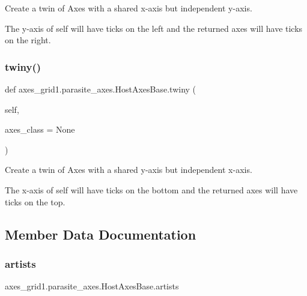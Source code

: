 \begin{DoxyVerb}Create a twin of Axes with a shared x-axis but independent y-axis.

The y-axis of self will have ticks on the left and the returned axes
will have ticks on the right.
\end{DoxyVerb}
 \mbox{\label{classaxes__grid1_1_1parasite__axes_1_1HostAxesBase_a473fb8cb8850ff806fe87a140bf8e6f7}} 
\subsubsection{\texorpdfstring{twiny()}{twiny()}}
{\footnotesize\ttfamily def axes\+\_\+grid1.\+parasite\+\_\+axes.\+Host\+Axes\+Base.\+twiny (\begin{DoxyParamCaption}\item[{}]{self,  }\item[{}]{axes\+\_\+class = {\ttfamily None} }\end{DoxyParamCaption})}

\begin{DoxyVerb}Create a twin of Axes with a shared y-axis but independent x-axis.

The x-axis of self will have ticks on the bottom and the returned axes
will have ticks on the top.
\end{DoxyVerb}
 

\subsection{Member Data Documentation}
\mbox{\label{classaxes__grid1_1_1parasite__axes_1_1HostAxesBase_a3e676e7d6b4ccce1d2dbd8f3a0b9dad8}} 
\subsubsection{\texorpdfstring{artists}{artists}}
{\footnotesize\ttfamily axes\+\_\+grid1.\+parasite\+\_\+axes.\+Host\+Axes\+Base.\+artists}

